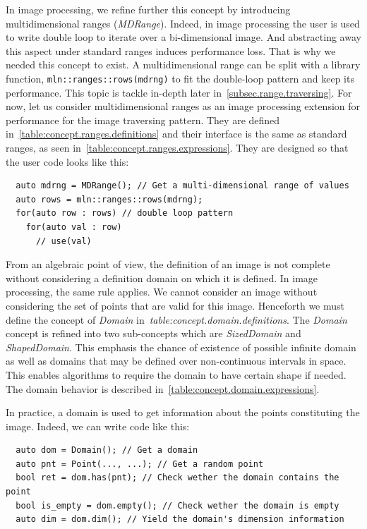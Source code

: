 In image processing, we refine further this concept by introducing multidimensional ranges (\emph{MDRange}). Indeed, in
image processing the user is used to write double loop to iterate over a bi-dimensional image. And abstracting away this
aspect under standard ranges induces performance loss. That is why we needed this concept to exist. A multidimensional
range can be split with a library function, \texttt{mln::ranges::rows(mdrng)} to fit the double-loop pattern and keep
its performance. This topic is tackle in-depth later in~\cref{subsec.range.traversing}. For now, let us consider
multidimensional ranges as an image processing extension for performance for the image traversing pattern. They are
defined in~\cref{table:concept.ranges.definitions} and their interface is the same as standard ranges, as seen
in~\cref{table:concept.ranges.expressions}. They are designed so that the user code looks like this:
\begin{verbatim}
  auto mdrng = MDRange(); // Get a multi-dimensional range of values
  auto rows = mln::ranges::rows(mdrng);
  for(auto row : rows) // double loop pattern
    for(auto val : row)
      // use(val)
\end{verbatim}

From an algebraic point of view, the definition of an image is not complete without considering a definition domain on
which it is defined. In image processing, the same rule applies. We cannot consider an image without considering the set
of points that are valid for this image. Henceforth we must define the concept of \emph{Domain}
in~\emph{table:concept.domain.definitions}. The \emph{Domain} concept is refined into two sub-concepts which are
\emph{SizedDomain} and \emph{ShapedDomain}. This emphasis the chance of existence of possible infinite domain as
well as domains that may be defined over non-continuous intervals in space. This enables algorithms to require the
domain to have certain shape if needed. The domain behavior is described in~\cref{table:concept.domain.expressions}.

In practice, a domain is used to get information about the points constituting the image. Indeed, we can write code
like this:
\begin{verbatim}
  auto dom = Domain(); // Get a domain
  auto pnt = Point(..., ...); // Get a random point
  bool ret = dom.has(pnt); // Check wether the domain contains the point
  bool is_empty = dom.empty(); // Check wether the domain is empty
  auto dim = dom.dim(); // Yield the domain's dimension information
\end{verbatim}

